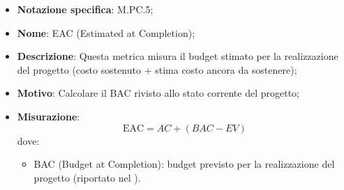 \begin{itemize}
    \item \textbf{Notazione specifica}: M.PC.5;
    \item \textbf{Nome}: EAC (Estimated at Completion);
    \item \textbf{Descrizione}: Questa metrica misura il budget stimato per la realizzazione del progetto (costo sostenuto + stima costo ancora da sostenere);
    \item \textbf{Motivo}: Calcolare il BAC rivisto allo stato corrente del progetto;
    \item \textbf{Misurazione}:
    \[
        \text{EAC} = \textit{AC} + (\textit{BAC} - \textit{EV})
    \]
    dove:
    \begin{itemize}
        \item BAC (Budget at Completion): budget previsto per la realizzazione del progetto (riportato nel \VersionePP).
    \end{itemize}
\end{itemize}
